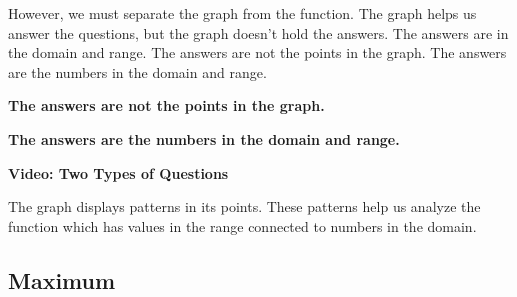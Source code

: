 \documentclass{ximera}
\begin{document}
However, we must separate the graph from the function.  The graph helps us answer the questions, but the graph doesn't hold the answers.  The answers are in the domain and range.  The answers are not the points in the graph.  The answers are the numbers in the domain and range.



\begin{center}

\textbf{\textcolor{blue!55!black}{The answers are not the points in the graph.}} 


\textbf{\textcolor{blue!55!black}{The answers are the numbers in the domain and range.}}

\end{center}







\begin{explanation} \textbf{\textcolor{red!75!green}{Video: Two Types of Questions}}



\begin{onlineOnly}
\begin{expandable} 

\begin{center}
\end{center}

\end{expandable}
\end{onlineOnly}

\end{explanation}









The graph displays patterns in its points.  These patterns help us analyze the function which has values in the range connected to numbers in the domain.




\subsection*{Maximum}
\end{document}
